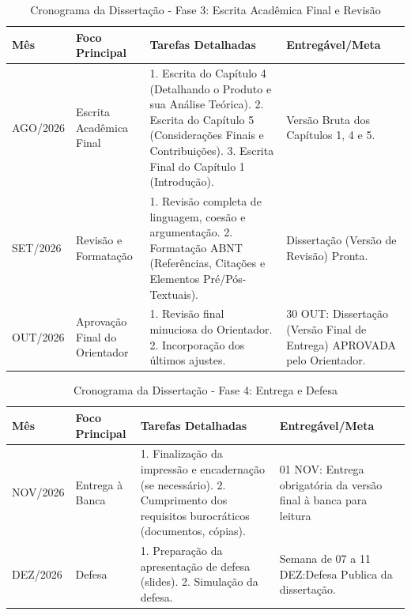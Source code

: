\begin{table}[!ht]
    \centering
    \caption{Cronograma da Dissertação - Fase 3: Escrita Acadêmica Final e Revisão}
    
    \begin{tabular}{p{2cm} p{2.5cm} p{7cm} p{2.5cm}}
    \hline
    \textbf{Mês} & \textbf{Foco Principal} & \textbf{Tarefas Detalhadas} & \textbf{Entregável/Meta}\\
    \hline
    AGO/2026 & Escrita Acadêmica Final & 1. Escrita do Capítulo 4 (Detalhando o Produto e sua Análise Teórica). 2. Escrita do Capítulo 5 (Considerações Finais e Contribuições). 3. Escrita Final do Capítulo 1 (Introdução). & Versão Bruta dos Capítulos 1, 4 e 5.\\
    \hline
    SET/2026 & Revisão e Formatação & 1. Revisão completa de linguagem, coesão e argumentação. 2. Formatação ABNT (Referências, Citações e Elementos Pré/Pós-Textuais). & Dissertação (Versão de Revisão) Pronta.\\
    \hline
    OUT/2026 & Aprovação Final do Orientador & 1. Revisão final minuciosa do Orientador. 2. Incorporação dos últimos ajustes. & 30 OUT: Dissertação (Versão Final de Entrega) APROVADA pelo Orientador.\\
    \hline
    \end{tabular} \label{tab:cronograma-fase3}
\end{table}


\begin{table}[!ht]
    \centering
    \caption{Cronograma da Dissertação - Fase 4: Entrega e Defesa}
    
    \begin{tabular}{p{2cm} p{3cm} p{6.5cm} p{2.5cm}}
    \hline
    \textbf{Mês} & \textbf{Foco Principal} & \textbf{Tarefas Detalhadas} & \textbf{Entregável/Meta}\\
    \hline
    NOV/2026 & Entrega à Banca & 1. Finalização da impressão e encadernação (se necessário). 2. Cumprimento dos requisitos burocráticos (documentos, cópias). & 01 NOV: Entrega obrigatória da versão final à banca para leitura \\
    \hline
    DEZ/2026 & Defesa & 1. Preparação da apresentação de defesa (slides). 2. Simulação da defesa. & Semana de 07 a 11 DEZ:Defesa Publica da dissertação. \\
    \hline
    \end{tabular} \label{tab:cronograma-fase4}
\end{table}
